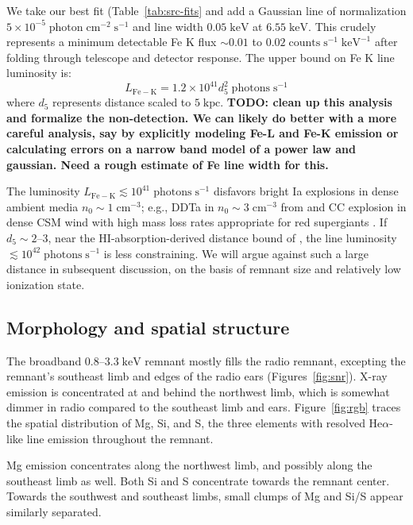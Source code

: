 \documentclass[preprint2,tighten,trackchanges]{aastex6}
\newcommand*{\mt}{\mathrm}
\newcommand*{\unit}[1]{\;\mt{#1}}  %
\newcommand*{\abt}{\mathord{\sim}} %
\begin{document}
We take our best fit (Table~\ref{tab:src-fits} and add a Gaussian line of
normalization $5 \times 10^{-5} \unit{photon\;cm^{-2}\;s^{-1}}$ and
line width $0.05 \unit{keV}$ at $6.55 \unit{keV}$.
This crudely represents a minimum detectable Fe K flux
$\abt 0.01$ to $0.02 \unit{counts\;s^{-1}\;keV^{-1}}$ after folding through
telescope and detector response.
The upper bound on Fe K line luminosity is:
\[
    L_{\mt{Fe-K}} = 1.2 \times 10^{41} d_5^2 \unit{photons\;s^{-1}}
\]
where $d_5$ represents distance scaled to $5 \unit{kpc}$.
\textbf{TODO: clean up this analysis and formalize the non-detection.
We can likely do better with a more careful analysis, say by explicitly
modeling Fe-L and Fe-K emission or calculating errors on a narrow band model of
a power law and gaussian.  Need a rough estimate of Fe line width for this.}

The luminosity $L_{\mt{Fe-K}} \lesssim 10^{41} \unit{photons\;s^{-1}}$
disfavors bright Ia explosions in dense ambient media
$n_0 \sim 1 \unit{cm^{-3}}$; e.g., DDTa in $n_0 \sim 3 \unit{cm^{-3}}$ from
\citet{badenes2003, badenes2005, badenes2006} \citep{yamaguchi2014-iron}
and CC explosion in dense CSM wind with high mass loss rates appropriate for
red supergiants \citep{patnaude2015}.
If $d_5 \sim 2$--$3$, near the HI-absorption-derived distance bound of
\citet{gaensler1998-g309}, the line luminosity
$\lesssim 10^{42} \unit{photons\;s^{-1}}$ is less constraining.
We will argue against such a large distance in subsequent discussion, on
the basis of remnant size and relatively low ionization state.

\subsection{Morphology and spatial structure}

The broadband $0.8$--$3.3 \unit{keV}$ remnant mostly fills the radio remnant,
excepting the remnant's southeast limb and edges of the radio ears
(Figures~\ref{fig:snr}).
X-ray emission is concentrated at and behind the northwest limb, which is
somewhat dimmer in radio compared to the southeast limb and ears.
Figure~\ref{fig:rgb} traces the spatial distribution of Mg, Si, and S, the
three elements with resolved He$\alpha$-like line emission throughout the
remnant.

Mg emission concentrates along the northwest limb, and possibly along the
southeast limb as well.
Both Si and S concentrate towards the remnant center.
Towards the southwest and southeast limbs, small clumps of Mg and Si/S appear
similarly separated.
\end{document}

